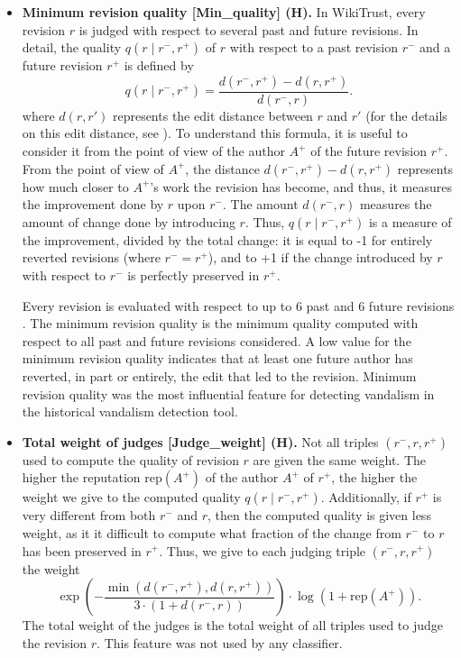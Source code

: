 \begin{itemize}
\item \textbf{Minimum revision quality [Min\_quality] (H).}  In WikiTrust, every revision $r$ is judged with respect to several past and future revisions.
In detail, the quality $q(r \mid r^{-}, r^{+})$ of $r$ with respect to a past revision $r^{-}$ and a future revision $r^{+}$ is defined by
\[
  q(r \mid r^{-}, r^{+}) = \frac{d(r^{-}, r^{+}) - d(r, r^{+})}{d(r^{-}, r)}.
\]
where $d(r,r')$ represents the edit distance between $r$ and $r'$ (for the details on this edit distance, see \cite{www07}).
To understand this formula, it is useful to consider it from the point of view of the author $A^{+}$ of the future revision $r^{+}$.
From the point of view of $A^{+}$, the distance $d(r^{-}, r^{+}) - d(r, r^{+})$ represents how much closer to $A^{+}$'s work the revision has become, and thus, it measures the improvement done by $r$ upon $r^{-}$.
The amount $d(r^{-}, r)$ measures the amount of change done by introducing $r$.
Thus, $q(r \mid r^{-}, r^{+})$ is a measure of the improvement, divided by the total change: it is equal to -1 for entirely reverted revisions (where $r^{-} = r^{+}$), and to +1 if the change introduced by $r$ with respect to $r^-$ is perfectly preserved in $r^{+}$.

Every revision is evaluated with respect to up to 6 past and 6 future revisions \cite{AIsec08}.
The minimum revision quality is the minimum quality computed with respect to all past and future revisions considered.
A low value for the minimum revision quality indicates that at least one future author has reverted, in part or entirely, the edit that led to the revision.
Minimum revision quality was the most influential feature for detecting vandalism in the historical vandalism detection tool.

\item \textbf{Total weight of judges [Judge\_weight] (H).}
Not all triples $(r^{-}, r, r^{+})$ used to compute the quality of revision $r$ are given the same weight.  The higher the reputation ${\textrm{rep}}(A^{+})$  of the author $A^{+}$ of $r^{+}$, the higher the weight we give to the computed quality $q(r \mid r^{-}, r^{+})$.
Additionally, if $r^{+}$ is very different from both $r^{-}$ and $r$, then the computed quality is given less weight, as it it difficult to compute what fraction of the change from $r^{-}$ to $r$ has been preserved in $r^{+}$.
Thus, we give to each judging triple $(r^{-}, r, r^{+})$ the weight
\[
\exp \left( -
\frac{\min(d(r^{-}, r^{+}), d(r, r^{+}))}{3 \cdot (1 + d(r^{-}, r))} \right)
\cdot \log(1 + {\textrm{rep}}(A^{+})).
\]
The total weight of the judges is the total weight of all triples used to judge the revision $r$.
This feature was not used by any classifier.


\end{itemize}

